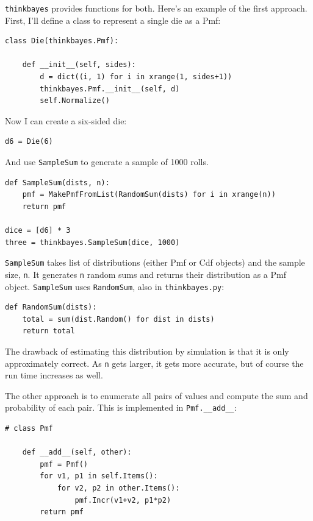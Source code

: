 \documentclass[12pt]{book}
\begin{document}
\verb"thinkbayes" provides functions for both.  Here's an example
of the first approach.  First, I'll define a class to represent
a single die as a Pmf:

\begin{verbatim}
class Die(thinkbayes.Pmf):

    def __init__(self, sides):
        d = dict((i, 1) for i in xrange(1, sides+1))
        thinkbayes.Pmf.__init__(self, d)
        self.Normalize()
\end{verbatim}

Now I can create a six-sided die:

\begin{verbatim}
d6 = Die(6)
\end{verbatim}

And use \verb"SampleSum" to generate a sample of 1000 rolls.

\begin{verbatim}
def SampleSum(dists, n):
    pmf = MakePmfFromList(RandomSum(dists) for i in xrange(n))
    return pmf

dice = [d6] * 3
three = thinkbayes.SampleSum(dice, 1000)
\end{verbatim}

\verb"SampleSum" takes list of distributions (either Pmf or Cdf
objects) and the sample size, {\tt n}.  It generates {\tt n} random
sums and returns their distribution as a Pmf object.  \verb"SampleSum"
uses \verb"RandomSum", also in \verb"thinkbayes.py":

\begin{verbatim}
def RandomSum(dists):
    total = sum(dist.Random() for dist in dists)
    return total
\end{verbatim}

The drawback of estimating this distribution by simulation is that
it is only approximately correct.  As \verb"n" gets larger, it gets
more accurate, but of course the run time increases as well.

The other approach is to enumerate all pairs of values and
compute the sum and probability of each pair.  This is implemented
in \verb"Pmf.__add__":

\begin{verbatim}
# class Pmf

    def __add__(self, other):
        pmf = Pmf()
        for v1, p1 in self.Items():
            for v2, p2 in other.Items():
                pmf.Incr(v1+v2, p1*p2)
        return pmf
\end{verbatim}
\end{document}

